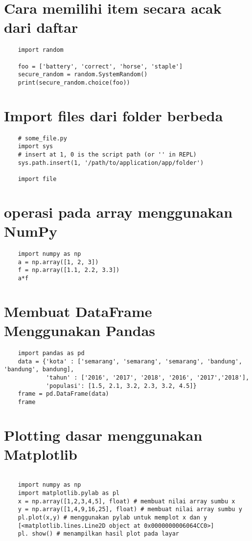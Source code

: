 \documentclass[12pt]{article} %
\begin{document}
\section{Cara memilihi item secara acak dari daftar}
\begin{lstlisting}
	import random
		
	foo = ['battery', 'correct', 'horse', 'staple']
	secure_random = random.SystemRandom()
	print(secure_random.choice(foo))
\end{lstlisting}

\section {Import files dari folder berbeda}
\begin{lstlisting}
	# some_file.py
	import sys
	# insert at 1, 0 is the script path (or '' in REPL)
	sys.path.insert(1, '/path/to/application/app/folder')
		
	import file
\end{lstlisting}

\section {operasi pada array menggunakan NumPy}
\begin{lstlisting}
	import numpy as np
	a = np.array([1, 2, 3])
	f = np.array([1.1, 2.2, 3.3])
	a*f
\end{lstlisting}

\section {Membuat DataFrame Menggunakan Pandas}
\begin{lstlisting}
	import pandas as pd
	data = {'kota' : ['semarang', 'semarang', 'semarang', 'bandung', 'bandung', bandung],
			'tahun' : ['2016', '2017', '2018', '2016', '2017','2018'],
			'populasi': [1.5, 2.1, 3.2, 2.3, 3.2, 4.5]}
	frame = pd.DataFrame(data)
	frame
\end{lstlisting}

\section {Plotting dasar menggunakan Matplotlib}
\begin{lstlisting}

	import numpy as np
	import matplotlib.pylab as pl
	x = np.array([1,2,3,4,5], float) # membuat nilai array sumbu x
	y = np.array([1,4,9,16,25], float) # membuat nilai array sumbu y
	pl.plot(x,y) # menggunakan pylab untuk memplot x dan y
	[<matplotlib.lines.Line2D object at 0x0000000006064CC0>]
	pl. show() # menampilkan hasil plot pada layar
\end{lstlisting}
\end{document}
